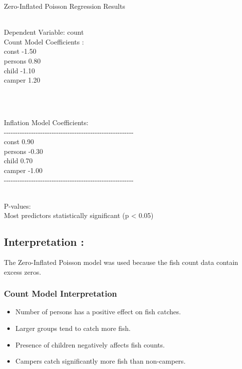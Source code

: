 \documentclass[
]{article}
\begin{document}
Zero-Inflated Poisson Regression Results\\
\strut \\
Dependent Variable: count\\
Count Model Coefficients :\\
const -1.50\\
persons 0.80\\
child -1.10\\
camper 1.20\\
\strut \\
\strut \\
Inflation Model Coefficients:\\
-\/-\/-\/-\/-\/-\/-\/-\/-\/-\/-\/-\/-\/-\/-\/-\/-\/-\/-\/-\/-\/-\/-\/-\/-\/-\/-\/-\/-\/-\/-\/-\/-\/-\/-\/-\/-\/-\/-\/-\/-\/-\/-\/-\/-\/-\/-\/-\/-\/-\/-\/-\/-\/-\/-\/-\/-\\
const 0.90\\
persons -0.30\\
child 0.70\\
camper -1.00\\
-\/-\/-\/-\/-\/-\/-\/-\/-\/-\/-\/-\/-\/-\/-\/-\/-\/-\/-\/-\/-\/-\/-\/-\/-\/-\/-\/-\/-\/-\/-\/-\/-\/-\/-\/-\/-\/-\/-\/-\/-\/-\/-\/-\/-\/-\/-\/-\/-\/-\/-\/-\/-\/-\/-\/-\/-\\
\strut \\
P-values:\\
Most predictors statistically significant (p \textless{} 0.05)

\subsection{\texorpdfstring{\textbf{Interpretation
:}}{Interpretation :}}\label{interpretation-17}

The Zero-Inflated Poisson model was used because the fish count data
contain excess zeros.

\subsubsection{Count Model
Interpretation}\label{count-model-interpretation}

\begin{itemize}
\item
  Number of persons has a positive effect on fish catches.
\item
  Larger groups tend to catch more fish.
\item
  Presence of children negatively affects fish counts.
\item
  Campers catch significantly more fish than non-campers.
\end{itemize}
\end{document}

